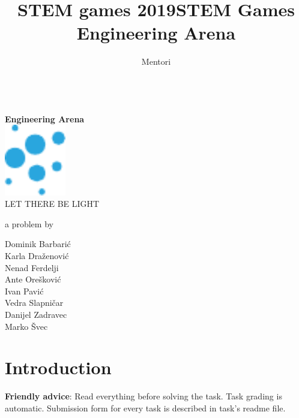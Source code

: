 \documentclass{article}
\title{STEM games 2019}
\author{Mentori}
\title{STEM Games Engineering Arena}
\date{}
\begin{document}
	
	\thispagestyle{empty}
	\newpage
	\thispagestyle{empty}
	\vspace*{1cm}
	\begin{center}
		
		\textbf{}\\
		\vspace*{0.4cm}
		\textbf{\Huge{Engineering Arena}}\\
		\vspace*{2cm}
		\includegraphics[width=0.2\textwidth]{logos/e} \\
		\vspace*{1.5cm}
		\huge{LET THERE BE LIGHT}
		
		\medskip
		
		\normalsize{a problem by}
		
		\medskip
		
		Dominik Barbarić \\
		Karla Draženović \\
		Nenad Ferdelji \\
		Ante Orešković \\
		Ivan Pavić \\
		Vedra Slapničar \\
		Danijel Zadravec \\
		Marko Švec 
		
		\vspace{6cm}
		
		
		\normalsize{}
	\end{center}
	
	
	\section{Introduction}
	
	\noindent 
	\textbf{Friendly advice}: Read everything before solving the task. Task grading is automatic. Submission form for every task is described in task's readme file.
	
\end{document}
